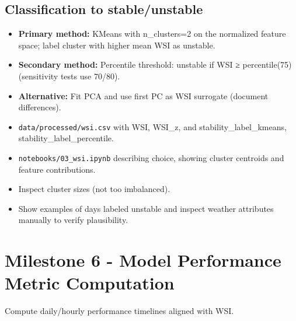 \documentclass[11pt,a4paper]{article}
\begin{document}
\subsection{Classification to stable/unstable}
\begin{itemize}
    \item \textbf{Primary method:} KMeans with n\_clusters=2 on the normalized feature space; label cluster with higher mean WSI as unstable.
    \item \textbf{Secondary method:} Percentile threshold: unstable if WSI ≥ percentile(75) (sensitivity tests use 70/80).
    \item \textbf{Alternative:} Fit PCA and use first PC as WSI surrogate (document differences).
\end{itemize}

\begin{deliverablebox}
\begin{itemize}
    \item \texttt{data/processed/wsi.csv} with WSI, WSI\_z, and stability\_label\_kmeans, stability\_label\_percentile.
    \item \texttt{notebooks/03\_wsi.ipynb} describing choice, showing cluster centroids and feature contributions.
\end{itemize}
\end{deliverablebox}

\begin{checkbox}
\begin{itemize}
    \item Inspect cluster sizes (not too imbalanced).
    \item Show examples of days labeled unstable and inspect weather attributes manually to verify plausibility.
\end{itemize}
\end{checkbox}

\section{Milestone 6 - Model Performance Metric Computation}

\begin{objectivebox}
Compute daily/hourly performance timelines aligned with WSI.
\end{objectivebox}
\end{document}
